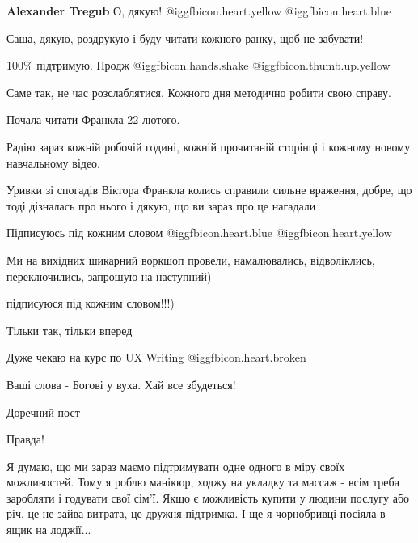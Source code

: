 \begin{itemize}
\begin{itemize}
\textbf{Alexander Tregub} О, дякую! @igg{fbicon.heart.yellow}  @igg{fbicon.heart.blue} 

\end{itemize} %


Саша, дякую, роздрукую і буду читати кожного ранку, щоб не забувати!

100\% підтримую. Продж  @igg{fbicon.hands.shake}  @igg{fbicon.thumb.up.yellow} 


Саме так, не час розслаблятися. Кожного дня методично робити свою справу.


Почала читати Франкла 22 лютого.

Радію зараз кожній робочій годині, кожній прочитаній сторінці і кожному новому
навчальному відео.


Уривки зі спогадів Віктора Франкла колись справили сильне враження, добре, що
тоді дізналась про нього і дякую, що ви зараз про це нагадали

Підписуюсь під кожним словом  @igg{fbicon.heart.blue}  @igg{fbicon.heart.yellow} 


Ми на вихідних шикарний воркшоп провели, намалювались, відволіклись,
переключились, запрошую на наступний)

підписуюся під кожним словом!!!)

Тільки так, тільки вперед

Дуже чекаю на курс по UX Writing  @igg{fbicon.heart.broken} 

Ваші слова - Богові у вуха. Хай все збудеться!

Доречний пост

Правда!


Я думаю, що ми зараз маємо підтримувати одне одного в міру своїх можливостей.
Тому я роблю манікюр, ходжу на укладку та массаж - всім треба заробляти і
годувати свої сім'ї. Якщо є можливість купити у людини послугу або річ, це не
зайва витрата, це дружня підтримка. І ще я чорнобривці посіяла в ящик на
лоджії...


\end{itemize} %
